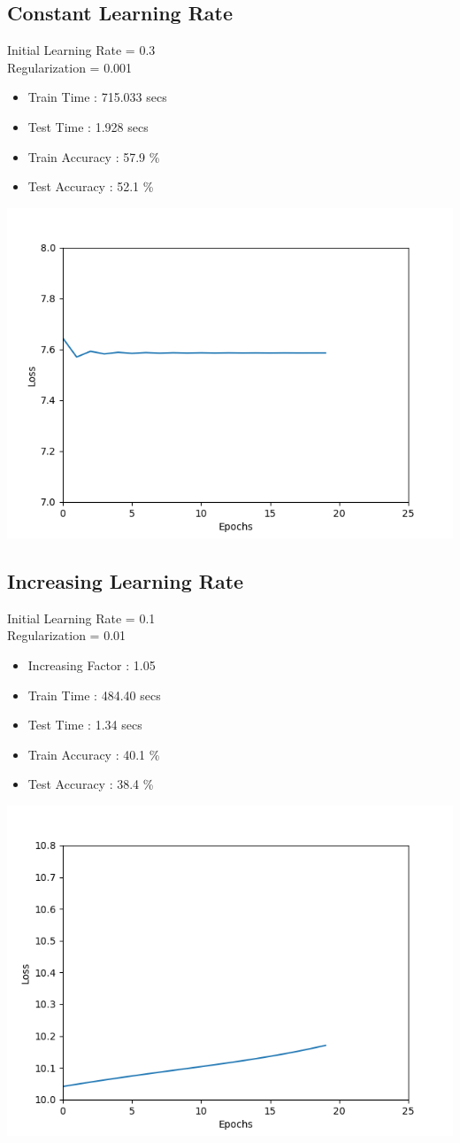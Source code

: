 \documentclass[12pt]{article}
\begin{document}
\subsection{Constant Learning Rate}
Initial Learning Rate = 0.3\\
Regularization = 0.001
\begin{itemize}
\item Train Time : 715.033 secs
\item Test Time :  1.928 secs
\item Train Accuracy : 57.9 \%
\item Test Accuracy : 52.1 \%
\end{itemize}
\includegraphics[scale = 0.5]{constant}
\subsection{Increasing Learning Rate}
Initial Learning Rate = 0.1\\
Regularization = 0.01
\begin{itemize}
\item Increasing Factor : 1.05
\item Train Time : 484.40 secs
\item Test Time : 1.34 secs
\item Train Accuracy : 40.1 \%
\item Test Accuracy : 38.4 \%
\end{itemize}
\includegraphics[scale = 0.5]{increasing}
\end{document}
